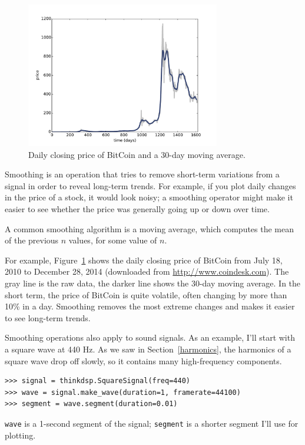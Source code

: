 \documentclass[12pt]{book}
\begin{document}
\begin{figure}
\centerline{\includegraphics[height=2.5in]{figs/convolution1.pdf}}
\caption{Daily closing price of BitCoin and a 30-day moving
average.}
\label{fig.convolution1}
\end{figure}

Smoothing is an operation that tries to remove short-term variations
from a signal in order to reveal long-term trends.  For example, if
you plot daily changes in the price of a stock, it would look noisy;
a smoothing operator might make it easier to see whether the price
was generally going up or down over time.  

A common smoothing algorithm is a moving average, which computes
the mean of the previous $n$ values, for some value of $n$.

For example, Figure~\ref{fig.convolution1} shows the daily
closing price of BitCoin from July 18, 2010 to December 28,
2014 (downloaded from \url{http://www.coindesk.com}).  The gray line
is the raw data, the darker line shows the 30-day moving average.
In the short term, the price of BitCoin is quite volatile, often
changing by more than 10\% in a day.  Smoothing removes the most
extreme changes and makes it easier to see long-term trends.

Smoothing operations also apply to sound signals.  As an example, I'll
start with a square wave at 440 Hz.  As we saw in
Section~\ref{harmonics}, the harmonics of a square wave drop off
slowly, so it contains many high-frequency components.

\begin{verbatim}
>>> signal = thinkdsp.SquareSignal(freq=440)
>>> wave = signal.make_wave(duration=1, framerate=44100)
>>> segment = wave.segment(duration=0.01)
\end{verbatim}

{\tt wave} is a 1-second segment of the signal; {\tt segment}
is a shorter segment I'll use for plotting.
\end{document}
